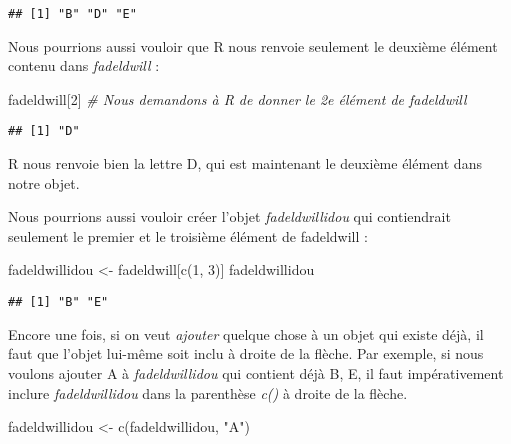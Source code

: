 \documentclass[
]{book}
\newenvironment{Shaded}{\begin{snugshade}}{\end{snugshade}}
\newcommand{\CommentTok}[1]{\textcolor[rgb]{0.56,0.35,0.01}{\textit{#1}}}
\newcommand{\DecValTok}[1]{\textcolor[rgb]{0.00,0.00,0.81}{#1}}
\newcommand{\FunctionTok}[1]{\textcolor[rgb]{0.00,0.00,0.00}{#1}}
\newcommand{\NormalTok}[1]{#1}
\newcommand{\OtherTok}[1]{\textcolor[rgb]{0.56,0.35,0.01}{#1}}
\newcommand{\StringTok}[1]{\textcolor[rgb]{0.31,0.60,0.02}{#1}}
\begin{document}
\begin{verbatim}
## [1] "B" "D" "E"
\end{verbatim}

Nous pourrions aussi vouloir que R nous renvoie seulement le deuxième élément contenu dans \emph{fadeldwill} :

\begin{Shaded}
\begin{Highlighting}[]
\NormalTok{fadeldwill[}\DecValTok{2}\NormalTok{] }\CommentTok{\# Nous demandons à R de donner le 2e élément de fadeldwill}
\end{Highlighting}
\end{Shaded}

\begin{verbatim}
## [1] "D"
\end{verbatim}

R nous renvoie bien la lettre D, qui est maintenant le deuxième élément dans notre objet.

Nous pourrions aussi vouloir créer l'objet \emph{fadeldwillidou} qui contiendrait seulement le premier et le troisième élément de fadeldwill :

\begin{Shaded}
\begin{Highlighting}[]
\NormalTok{fadeldwillidou }\OtherTok{\textless{}{-}}\NormalTok{ fadeldwill[}\FunctionTok{c}\NormalTok{(}\DecValTok{1}\NormalTok{, }\DecValTok{3}\NormalTok{)]}
\NormalTok{fadeldwillidou}
\end{Highlighting}
\end{Shaded}

\begin{verbatim}
## [1] "B" "E"
\end{verbatim}

Encore une fois, si on veut \emph{ajouter} quelque chose à un objet qui existe déjà, il faut que l'objet lui-même soit inclu à droite de la flèche. Par exemple, si nous voulons ajouter A à \emph{fadeldwillidou} qui contient déjà B, E, il faut impérativement inclure \emph{fadeldwillidou} dans la parenthèse \emph{c()} à droite de la flèche.

\begin{Shaded}
\begin{Highlighting}[]
\NormalTok{fadeldwillidou }\OtherTok{\textless{}{-}} \FunctionTok{c}\NormalTok{(fadeldwillidou, }\StringTok{"A"}\NormalTok{)}
\end{Highlighting}
\end{Shaded}
\end{document}
